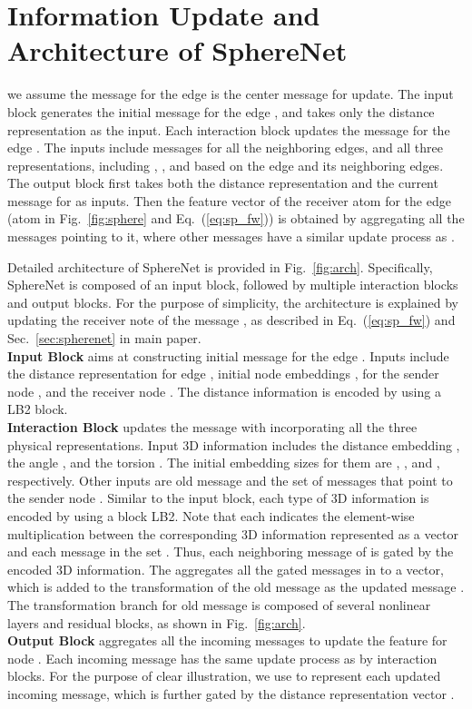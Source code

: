 \documentclass{article}
\begin{document}
\section{Information Update and Architecture of SphereNet} \label{sec:arch} \label{sec:supp_B}
we assume the message 
 for the edge  is the center message for update.
The input block generates the initial message for the edge , 
and
takes only the distance representation  as the input. 
Each interaction block updates the message for the edge .
The inputs include messages for all the neighboring edges,
and all three representations, including
,
,
and 
based on the edge  and its neighboring edges.
The output block first takes both the distance representation and the
current message for  as inputs.
Then the feature vector of the receiver atom for the edge  (atom  in Fig.~\ref{fig:sphere} and Eq.~(\ref{eq:sp_fw})) is obtained by 
aggregating all the messages pointing to it,
where other messages have a similar update process as .

Detailed architecture of SphereNet is provided in Fig.~\ref{fig:arch}.
Specifically, SphereNet is composed of an input block, followed by multiple interaction blocks and output blocks.
For the purpose of simplicity, the architecture is explained by
updating the receiver note  of the message ,
as described in Eq.~(\ref{eq:sp_fw}) and Sec.~\ref{sec:spherenet}
in main paper.\\
\textbf{Input Block} aims at constructing initial message 
for the edge .
Inputs include the distance representation  for edge , initial node embeddings
, 
for the sender node ,
and the receiver node .
The distance information is encoded by using a LB2 block.\\
\textbf{Interaction Block} updates the message 
with incorporating all the three physical representations.
Input 3D information includes the distance embedding ,
the angle ,
and the torsion .
The initial embedding sizes for them are ,
,
and , respectively.
Other inputs are old message  and the set of messages  that
point to the sender node .
Similar to the input block,
each type of 3D information is encoded by using a block LB2.
Note that each  indicates
the element-wise multiplication between the corresponding 
3D information represented as a vector and each message in the set .
Thus, each neighboring message of  is gated by the encoded 3D information.
The  aggregates all the gated messages in  to a vector,
which is added to the transformation of the old message 
as the updated message .
The transformation branch for old message 
is composed of several nonlinear layers and residual blocks,
as shown in Fig.~\ref{fig:arch}.\\
\textbf{Output Block} aggregates all the incoming messages to
update the feature for node .
Each incoming message has the same update process as 
by interaction blocks.
For the purpose of clear illustration, we use  to represent each updated incoming message, which is further gated by the distance representation vector .
\end{document}
